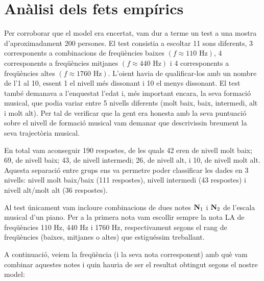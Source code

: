 \documentclass{article}
\theoremstyle{math}
\theoremstyle{TheoremNum}
\newcommand{\0}{\ensuremath{\vb{0}}}
\newcommand{\N}{\ensuremath{\vb{N}}}
\newcommand\Hz{\text{ Hz}}
\begin{document}
\section{Anàlisi dels fets empírics}
Per corroborar que el model era encertat, vam dur a terme un test a una mostra d'aproximadament 200 persones. El test consistia a escoltar 11 sons diferents, 3 corresponents a combinacions de freqüències baixes $(f \approx 110\Hz)$, 4 corresponents a freqüències mitjanes $(f \approx 440\Hz)$ i 4 corresponents a freqüències altes $(f \approx 1760\Hz)$. L'oient havia de qualificar-los amb un nombre de l'1 al 10, essent 1 el nivell més dissonant i 10 el menys dissonant. El test també demanava a l'enquestat l'edat i, més important encara, la seva formació musical, que podia variar entre 5 nivells diferents (molt baix, baix, intermedi, alt i molt alt). Per tal de verificar que la gent era honesta amb la seva puntuació sobre el nivell de formació musical vam demanar que descrivissin breument la seva trajectòria musical. \par
En total vam aconseguir 190 respostes, de les quals 42 eren de nivell molt baix; 69, de nivell baix; 43, de nivell intermedi; 26, de nivell alt, i 10, de nivell molt alt. Aquesta separació entre grups ens va permetre poder classificar les dades en 3 nivells: nivell molt baix/baix (111 respostes), nivell intermedi (43 respostes) i nivell alt/molt alt (36 respostes). \par
Al test únicament vam incloure combinacions de dues notes $\N_1$ i $\N_2$ de l'escala musical d'un piano. Per a la primera nota vam escollir sempre la nota LA de freqüències 110 Hz, 440 Hz i 1760 Hz, respectivament segons el rang de freqüències (baixes, mitjanes o altes) que estiguéssim treballant.\par A continuació, veiem la freqüència (i la seva nota corresponent) amb què vam combinar aquestes notes i quin hauria de ser el resultat obtingut segons el nostre model:
\end{document}

